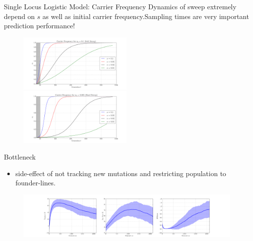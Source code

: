 \documentclass[t]{beamer} %
\begin{document}
\begin{frame}{Single Locus Logistic Model: Carrier Frequency}
Dynamics of sweep extremely depend on $s$ as well as initial carrier frequency.Sampling times are very important prediction performance!

\begin{figure}
\centering
\hspace{-0in}\includegraphics[trim={2in 0.5in 1.5in 0in},clip,page=2,width=0.5\textwidth]{sigmoidSoft}
\hspace{-0in}\includegraphics[trim={2in 0.5in 1.9in 0in},clip,page=2,width=0.5\textwidth]{sigmoidHard}
\end{figure}
\end{frame}

\begin{frame}{Bottleneck}
\begin{itemize}
	\item side-effect of not tracking new mutations and restricting population 
	to founder-lines.
\end{itemize}
\begin{figure}
\centering
\includegraphics[trim=2in 0 2in 0, clip,width=\textwidth]{bottleneck}
\end{figure}

\end{frame}
\end{document}
